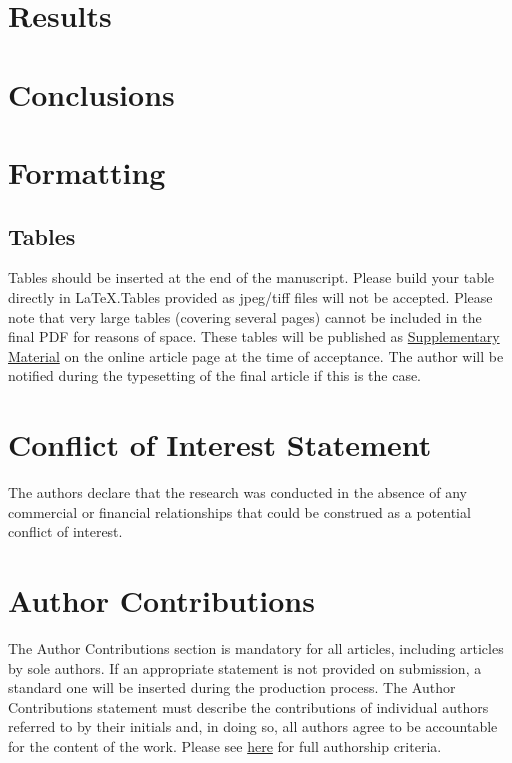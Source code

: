 \documentclass[utf8]{frontiersHLTH} %
\begin{document}
\section{Results}

\section{Conclusions}

\section{Formatting}

\subsection{Tables}
Tables should be inserted at the end of the manuscript. Please build your table directly in LaTeX.Tables provided as jpeg/tiff files will not be accepted. Please note that very large tables (covering several pages) cannot be included in the final PDF for reasons of space. These tables will be published as \href{http://home.frontiersin.org/about/author-guidelines#SupplementaryMaterial}{Supplementary Material} on the online article page at the time of acceptance. The author will be notified during the typesetting of the final article if this is the case. 

\section*{Conflict of Interest Statement}

The authors declare that the research was conducted in the absence of any commercial or financial relationships that could be construed as a potential conflict of interest.

\section*{Author Contributions}

The Author Contributions section is mandatory for all articles, including articles by sole authors. If an appropriate statement is not provided on submission, a standard one will be inserted during the production process. The Author Contributions statement must describe the contributions of individual authors referred to by their initials and, in doing so, all authors agree to be accountable for the content of the work. Please see  \href{http://home.frontiersin.org/about/author-guidelines#AuthorandContributors}{here} for full authorship criteria.
\end{document}

